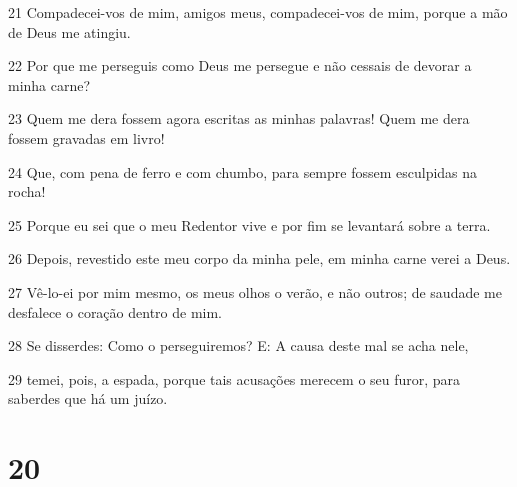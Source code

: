 \par 21 Compadecei-vos de mim, amigos meus, compadecei-vos de mim, porque a mão de Deus me atingiu.
\par 22 Por que me perseguis como Deus me persegue e não cessais de devorar a minha carne?
\par 23 Quem me dera fossem agora escritas as minhas palavras! Quem me dera fossem gravadas em livro!
\par 24 Que, com pena de ferro e com chumbo, para sempre fossem esculpidas na rocha!
\par 25 Porque eu sei que o meu Redentor vive e por fim se levantará sobre a terra.
\par 26 Depois, revestido este meu corpo da minha pele, em minha carne verei a Deus.
\par 27 Vê-lo-ei por mim mesmo, os meus olhos o verão, e não outros; de saudade me desfalece o coração dentro de mim.
\par 28 Se disserdes: Como o perseguiremos? E: A causa deste mal se acha nele,
\par 29 temei, pois, a espada, porque tais acusações merecem o seu furor, para saberdes que há um juízo.

\chapter{20}

